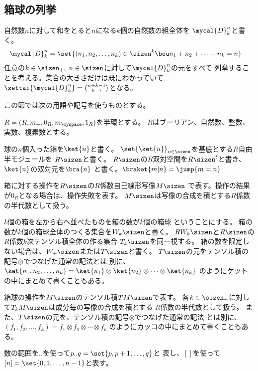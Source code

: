 \begingroup %
	\newcommand{\hakodama}{\mycal{D}}
	\newcommand{\sosei}{\mycal{C}}
	\newcommand{\bunkatu}{\mycal{P}}
	\newcommand{\myeven}{\ensuremath{{2\sizen}}}
	\newcommand{\myodd}{\ensuremath{{2\sizen+1}}}
	\newcommand{\kazu}[1]{\ensuremath{{\sharp_{\myop{#1}}}}}
	\newcommand{\id}{\myop{id}}
	\setlength\arraycolsep{2pt}
\subsection{箱球の列挙}\label{s2:箱球の列挙} %
	自然数$n$に対して和をとると$n$になる$k$個の自然数の組全体を
	$\hakodama_k^n$と書く。
	\begin{equation*}\begin{split} %
		\mycal{D}_k^n &= \set{(n_1,n_2,\dots,n_k)\in\sizen^k
			\bou n_1+n_2+\cdots+n_k=n}
	\end{split}\end{equation*} %
	任意の$k\in\sizen_+,\;n\in\sizen$に対して$\mycal{D}_k^n$の元をすべて
	列挙することを考える。集合の大きさだけは既にわかっていて
	$\zettai{\hakodama_k^n}=\binom{n+k-1}{k-1}$となる。

	この節では次の用語や記号を使うものとする。
	\begin{description}\setlength{\itemsep}{-1mm} %
		\item[係数] $R=(R,m_+,0_R,m_\myspace,1_R)$を半環とする。
		$R$はブーリアン、自然数、整数、実数、複素数とする。
		\item[箱] 球の$n$個入った箱を$\ket{n}$と書く。
		$\set{\ket{n}}_{n\in\sizen}$を基底とする$R$自由半モジュールを
		$R\sizen$と書く。
		$R\sizen$の$R$双対空間を$R\sizen^t$と書き、$\ket{n}$の双対元を$\bra{n}$
		と書く。$\braket{m|n}=\jump{m=n}$
		\item[箱の操作] 箱に対する操作を$R\sizen$の$R$係数自己線形写像$M\sizen$
		で表す。操作の結果が$0_R$となる場合は、操作失敗を表す。
		$M\sizen$は写像の合成を積とする$R$係数の半代数として扱う。
		\item[箱球] $k$個の箱を左から右へ並べたものを箱の数が$k$個の箱球
		ということにする。
		箱の数が$k$個の箱球全体のつくる集合を$W_k\sizen$と書く。
		$RW_k\sizen$と$R\sizen$の$R$係数$k$次テンソル積全体の作る集合
		$T_k\sizen$を同一視する。
		箱の数を限定しない場合は、$W_+\sizen$または$T\sizen$と書く。
		$T\sizen$の元をテンソル積の記号$\otimes$でつなげた通常の記法とは
		別に、$\ket{n_1,n_2,\dots,n_k}
		=\ket{n_1}\otimes\ket{n_2}\otimes\cdots\otimes\ket{n_k}$
		のようにケットの中にまとめて書くこともある。
		\item[箱球の操作] 箱球の操作を$M\sizen$のテンソル積$TM\sizen$で表す。
		各$k\in\sizen_+$に対して$T_kM\sizen$は成分毎の写像の合成を積とする
		$R$係数の半代数として扱う。
		また、$T\sizen$の元を、テンソル積の記号$\otimes$でつなげた通常の記法
		とは別に、$(f_1,f_2,\dots,f_k)
		=f_1\otimes f_2\otimes\cdots\otimes f_k$
		のようにカッコの中にまとめて書くこともある。
		\item[数の集合] 数の範囲を$..$を使って$p..q=\set{p,p+1,\dots,q}$と
		表し、$[]$を使って$[n]=\set{0,1,\dots,n-1}$と表す。
	\end{description} %

